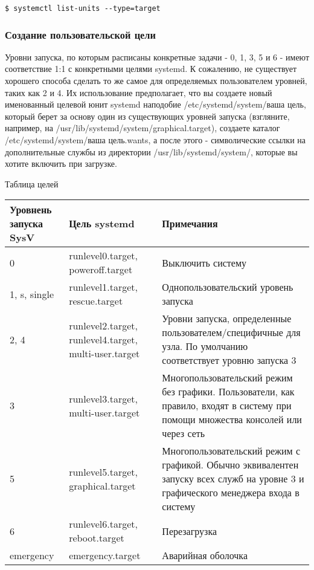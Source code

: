 \documentclass[a4paper,10pt,twoside]{article}
\begin{document}
\begin{verbatim}
$ systemctl list-units --type=target
\end{verbatim} 

\subsubsection{Создание пользовательской цели}
Уровни запуска, по которым расписаны конкретные задачи - 0, 1, 3, 5 и 6 - имеют соответствие 1:1 с конкретными целями systemd. К сожалению, не существует хорошего способа сделать то же самое для определяемых пользователем уровней, таких как 2 и 4. Их использование предполагает, что вы создаете новый именованный целевой юнит systemd наподобие /etc/systemd/system/ваша цель, который берет за основу один из существующих уровней запуска (взгляните, например, на /usr/lib/systemd/system/graphical.target), создаете каталог /etc/systemd/system/ваша цель.wants, а после этого - символические ссылки на дополнительные службы из директории /usr/lib/systemd/system/, которые вы хотите включить при загрузке.

Таблица целей

\begin{longtable}{ | m{3cm} | m{3cm} | m{10cm} | }\hline  
\textbf{Уровнень запуска SysV} & \textbf{Цель systemd} & \textbf{Примечания}\\\hline
0 & runlevel0.target, poweroff.target & Выключить систему\\\hline
1, s, single & runlevel1.target, rescue.target & Однопользовательский уровень запуска\\\hline
2, 4 & runlevel2.target, runlevel4.target, multi-user.target & Уровни запуска, определенные пользователем/специфичные для узла. По умолчанию соответствует уровню запуска 3\\\hline
3 & runlevel3.target, multi-user.target & Многопользовательский режим без графики. Пользователи, как правило, входят в систему при помощи множества консолей или через сеть\\\hline
5 & runlevel5.target, graphical.target & Многопользовательский режим с графикой. Обычно эквивалентен запуску всех служб на уровне 3 и графического менеджера входа в систему\\\hline
6 & runlevel6.target, reboot.target & Перезагрузка\\\hline
emergency & emergency.target & Аварийная оболочка\\\hline
\end{longtable}
\end{document}
